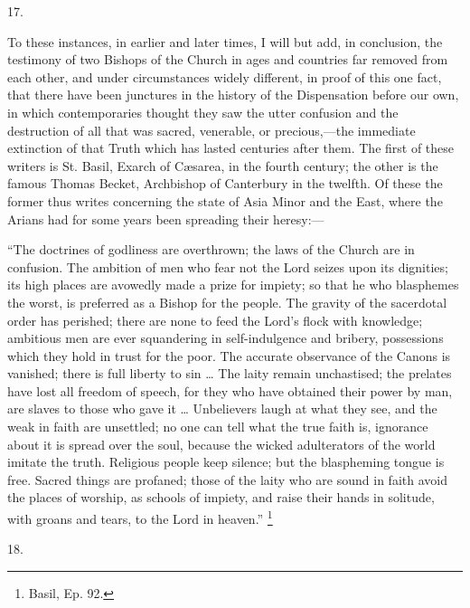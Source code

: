 17.

To these instances, in earlier and later times, I will but add, in
conclusion, the testimony of two Bishops of the Church in ages and
countries far removed from each other, and under circumstances widely
different, in proof of this one fact, that there have been junctures
in the history of the Dispensation before our own, in which
contemporaries thought they saw the utter confusion and the
destruction of all that was sacred, venerable, or precious,—the
immediate extinction of that Truth which has lasted centuries after
them. The first of these writers is St. Basil, Exarch of Cæsarea, in
the fourth century; the other is the famous Thomas Becket, Archbishop
of Canterbury in the twelfth. Of these the former thus writes
concerning the state of Asia Minor and the East, where the Arians had
for some years been spreading their heresy:—

``The doctrines of godliness are overthrown; the laws of the
Church are in confusion. The ambition of men who fear not the Lord
seizes upon its dignities; its high places are avowedly made a prize
for impiety; so that he who blasphemes the worst, is preferred as a
Bishop for the people. The gravity of the sacerdotal order has
perished; there are none to feed the Lord's flock with knowledge;
ambitious men are ever squandering in self-indulgence and bribery,
possessions which they hold in trust for the poor. The accurate
observance of the Canons is vanished; there is full liberty to sin …
The laity remain unchastised; the prelates have lost all freedom of
speech, for they who have obtained their power by man, are slaves to
those who gave it … Unbelievers laugh at what they see, and the weak
in faith are unsettled; no one can tell what the true faith is,
ignorance about it is spread over the soul, because the wicked
adulterators of the world imitate the truth. Religious people keep
silence; but the blaspheming tongue is free. Sacred things are
profaned; those of the laity who are sound in faith avoid the places
of worship, as schools of impiety, and raise their hands in solitude,
with groans and tears, to the Lord in heaven.'' \footnote{Basil, Ep. 92.}

18.

